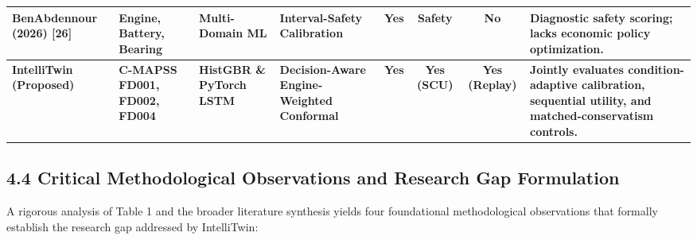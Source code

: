 \documentclass[12pt,a4paper]{article}
\begin{document}
\begin{table}[htbp]
\begin{tabularx}{\textwidth}{l p{2.2cm} p{2.5cm} p{2.5cm} c c c p{2.5cm}}
BenAbdennour (2026) [26] & Engine, Battery, Bearing & Multi-Domain ML & Interval-Safety Calibration & Yes & Safety & No & Diagnostic safety scoring; lacks economic policy optimization. \\
\midrule
\textbf{IntelliTwin (Proposed)} & \textbf{C-MAPSS FD001, FD002, FD004} & \textbf{HistGBR \& PyTorch LSTM} & \textbf{Decision-Aware Engine-Weighted Conformal} & \textbf{Yes} & \textbf{Yes (SCU)} & \textbf{Yes (Replay)} & \textbf{Jointly evaluates condition-adaptive calibration, sequential utility, and matched-conservatism controls.} \\
\bottomrule
\end{tabularx}
\end{table}

\subsection*{4.4 Critical Methodological Observations and Research Gap Formulation}
A rigorous analysis of Table 1 and the broader literature synthesis yields four foundational methodological observations that formally establish the research gap addressed by IntelliTwin:
\end{document}
